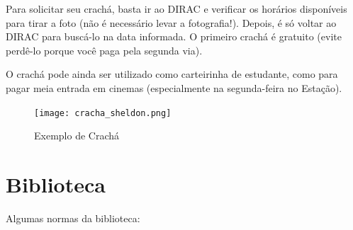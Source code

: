 \documentclass[a4paper,12pt,openany]{article}
\begin{document}
Para solicitar seu crachá, basta ir ao DIRAC e verificar os horários disponíveis para tirar a foto (não é necessário levar a fotografia!). Depois, é só voltar ao DIRAC para buscá-lo na data informada. O primeiro crachá é gratuito (evite perdê-lo porque você paga pela segunda via).

O crachá pode ainda ser utilizado como carteirinha de estudante, como para pagar meia entrada em cinemas (especialmente na segunda-feira no Estação).

	\begin{figure}[ht!]  \centering
		\texttt{[image: cracha\_sheldon.png]}
		\caption{Exemplo de Crachá}
	\end{figure}


\newpage
\section{Biblioteca}

Algumas normas da biblioteca:
\end{document}
